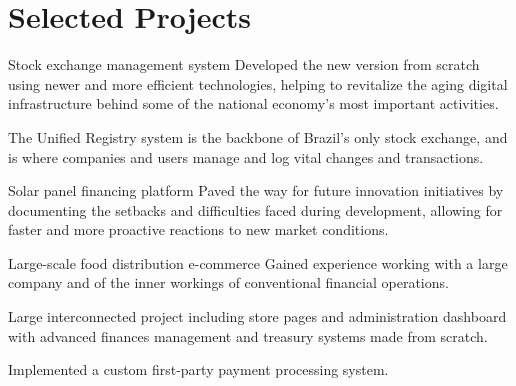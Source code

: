 \section{Selected Projects}

\begin{experience}{Stock exchange management system}{
}
Developed the new version from scratch using newer and more efficient technologies, helping to revitalize the aging digital infrastructure behind some of the national economy's most important activities.

\begin{contribs}
	\item{The Unified Registry system is the backbone of Brazil's only stock exchange, and is where companies and users manage and log vital changes and transactions.}
\end{contribs}
\end{experience}

\begin{experience}{Solar panel financing platform}{
}
Paved the way for future innovation initiatives by documenting the setbacks and difficulties faced during development, allowing for faster and more proactive reactions to new market conditions.
\end{experience}

\begin{experience}{Large-scale food distribution e-commerce}{
}
Gained experience working with a large company and of the inner workings of conventional financial operations.

\begin{contribs}
	\item{Large interconnected project including store pages and administration dashboard with advanced finances management and treasury systems made from scratch.}
	\item{Implemented a custom first-party payment processing system.}
\end{contribs}
\end{experience}
